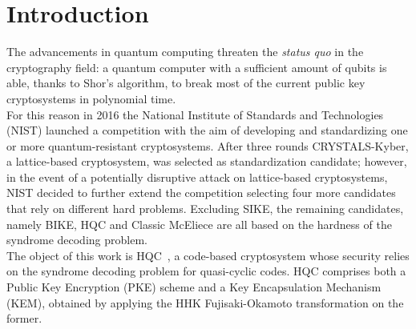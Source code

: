 \documentclass[11pt,a4paper,twocolumn]{article}
\theoremstyle{definition}
\begin{document}



\section{Introduction}
\label{sec:introduction}
The advancements in quantum computing threaten the \emph{status quo} in 
the cryptography field: a quantum computer with a sufficient amount of
qubits is able, thanks to Shor's algorithm,
to break most of the current public key cryptosystems in polynomial time.\\
For this reason in 2016 the National Institute of Standards and Technologies (NIST)
launched a competition with the aim of developing and standardizing one or more
quantum-resistant cryptosystems. After three rounds CRYSTALS-Kyber, a lattice-based
cryptosystem, was selected as standardization candidate; however, in the event of a potentially
disruptive attack on lattice-based cryptosystems, NIST decided to further extend the competition
selecting four more candidates that rely on different hard problems. Excluding SIKE, the remaining
candidates, namely BIKE, HQC and Classic McEliece
are all based on the hardness of the syndrome decoding problem.\\
The object of this work is HQC~\cite{melchor2018hamming}, a code-based cryptosystem whose
security relies on the syndrome decoding problem for quasi-cyclic codes. HQC comprises both a Public Key
Encryption (PKE) scheme and a Key Encapsulation Mechanism (KEM), obtained by applying the HHK Fujisaki-Okamoto 
transformation on the former.
\end{document}
